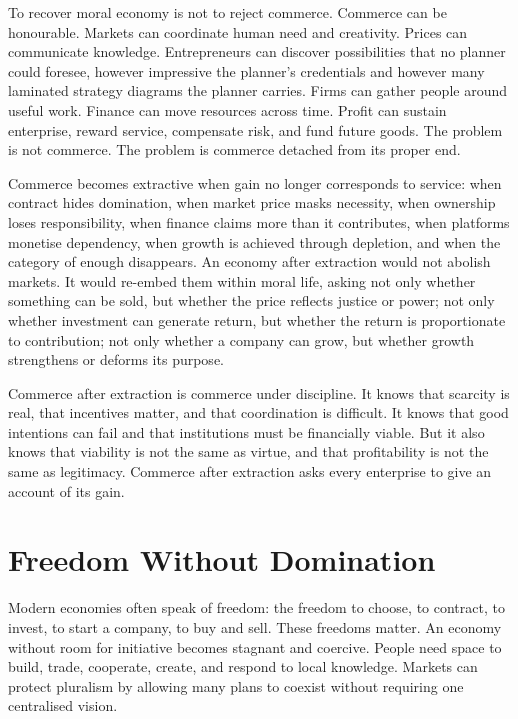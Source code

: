 \documentclass[11pt,a4paper,oneside]{book}
\begin{document}
To recover moral economy is not to reject commerce. Commerce can be honourable. Markets can coordinate human need and creativity. Prices can communicate knowledge. Entrepreneurs can discover possibilities that no planner could foresee, however impressive the planner's credentials and however many laminated strategy diagrams the planner carries. Firms can gather people around useful work. Finance can move resources across time. Profit can sustain enterprise, reward service, compensate risk, and fund future goods. The problem is not commerce. The problem is commerce detached from its proper end.

Commerce becomes extractive when gain no longer corresponds to service: when contract hides domination, when market price masks necessity, when ownership loses responsibility, when finance claims more than it contributes, when platforms monetise dependency, when growth is achieved through depletion, and when the category of enough disappears. An economy after extraction would not abolish markets. It would re-embed them within moral life, asking not only whether something can be sold, but whether the price reflects justice or power; not only whether investment can generate return, but whether the return is proportionate to contribution; not only whether a company can grow, but whether growth strengthens or deforms its purpose.

Commerce after extraction is commerce under discipline. It knows that scarcity is real, that incentives matter, and that coordination is difficult. It knows that good intentions can fail and that institutions must be financially viable. But it also knows that viability is not the same as virtue, and that profitability is not the same as legitimacy. Commerce after extraction asks every enterprise to give an account of its gain.

\section*{Freedom Without Domination}

Modern economies often speak of freedom: the freedom to choose, to contract, to invest, to start a company, to buy and sell. These freedoms matter. An economy without room for initiative becomes stagnant and coercive. People need space to build, trade, cooperate, create, and respond to local knowledge. Markets can protect pluralism by allowing many plans to coexist without requiring one centralised vision.
\end{document}
